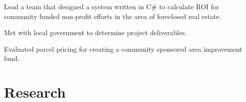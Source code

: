 \documentclass[letterpaper]{deedy-resume-openfont} %
\begin{document}
\begin{minipage}[t]{0.66\textwidth}
\sectionspace %




\sectionspace %


\begin{tightitemize}
\item  Lead a team that designed a system written in C\# to calculate ROI for community funded non-profit efforts in the area of foreclosed real estate.
\item Met with local government to determine project deliverables.
\item Evaluated parcel pricing for creating a community sponsored area improvement fund.
\end{tightitemize}



\section{Research}


\end{minipage}
\end{document}
